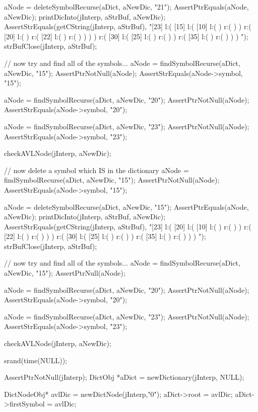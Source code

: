   aNode = deleteSymbolRecurse(aDict, aNewDic, "21");
  AssertPtrEquals(aNode, aNewDic);
  printDicInto(jInterp, aStrBuf, aNewDic);
  AssertStrEquals(getCString(jInterp, aStrBuf),
  "[23] l:( [15] l:( [10] l:(  ) r:(  )  ) r:( [20] l:(  ) r:( [22] l:(  ) r:(  )  )  )  ) r:( [30] l:( [25] l:(  ) r:(  )  ) r:( [35] l:(  ) r:(  )  )  ) ");
  strBufClose(jInterp, aStrBuf);

  // now try and find all of the symbols...
  aNode = findSymbolRecurse(aDict, aNewDic, "15");
  AssertPtrNotNull(aNode);
  AssertStrEquals(aNode->symbol, "15");

  aNode = findSymbolRecurse(aDict, aNewDic, "20");
  AssertPtrNotNull(aNode);
  AssertStrEquals(aNode->symbol, "20");

  aNode = findSymbolRecurse(aDict, aNewDic, "23");
  AssertPtrNotNull(aNode);
  AssertStrEquals(aNode->symbol, "23");

  checkAVLNode(jInterp, aNewDic);

  // now delete a symbol which IS in the dictionary
  aNode = findSymbolRecurse(aDict, aNewDic, "15");
  AssertPtrNotNull(aNode);
  AssertStrEquals(aNode->symbol, "15");
  
  aNode = deleteSymbolRecurse(aDict, aNewDic, "15");
  AssertPtrEquals(aNode, aNewDic);
  printDicInto(jInterp, aStrBuf, aNewDic);
  AssertStrEquals(getCString(jInterp, aStrBuf),
  "[23] l:( [20] l:( [10] l:(  ) r:(  )  ) r:( [22] l:(  ) r:(  )  )  ) r:( [30] l:( [25] l:(  ) r:(  )  ) r:( [35] l:(  ) r:(  )  )  ) ");
  strBufClose(jInterp, aStrBuf);

  // now try and find all of the symbols...
  aNode = findSymbolRecurse(aDict, aNewDic, "15");
  AssertPtrNull(aNode);

  aNode = findSymbolRecurse(aDict, aNewDic, "20");
  AssertPtrNotNull(aNode);
  AssertStrEquals(aNode->symbol, "20");

  aNode = findSymbolRecurse(aDict, aNewDic, "23");
  AssertPtrNotNull(aNode);
  AssertStrEquals(aNode->symbol, "23");

  checkAVLNode(jInterp, aNewDic);
\stopCTest
\stopTestCase

\startCTest

  srand(time(NULL));

  AssertPtrNotNull(jInterp);
  DictObj *aDict = newDictionary(jInterp, NULL);

  DictNodeObj* avlDic = newDictNode(jInterp,"0");
  aDict->root         = avlDic;
  aDict->firstSymbol  = avlDic;

